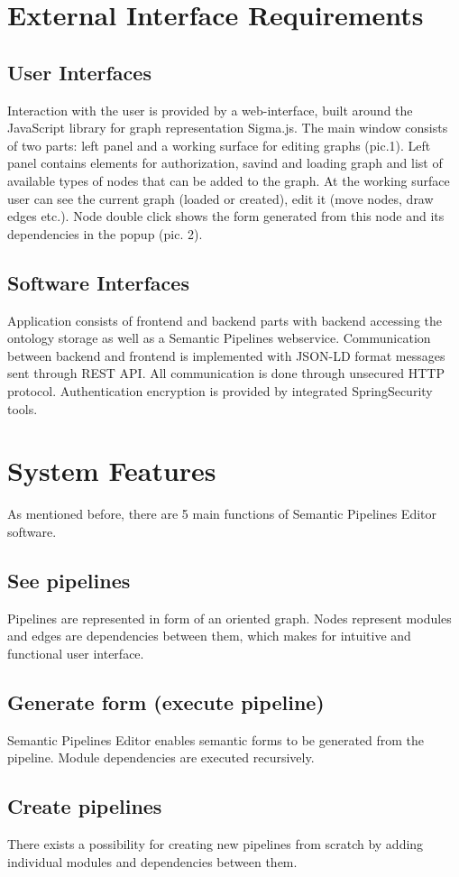 \documentclass{article}
\begin{document}
\section{External Interface Requirements}
\subsection{User Interfaces}
Interaction with the user is provided by a web-interface, built around the JavaScript library for graph representation Sigma.js. The main window consists of two parts: left panel and a working surface for editing graphs (pic.1). Left panel contains elements for authorization, savind and loading graph and list of available types of nodes that can be added to the graph. At the working surface user can see the current graph (loaded or created), edit it (move nodes, draw edges etc.). Node double click shows the form generated from this node and its dependencies in the popup (pic. 2).
\subsection{Software Interfaces}
Application consists of frontend and backend parts with backend accessing the ontology storage as well as a Semantic Pipelines webservice. Communication between backend and frontend is implemented with JSON-LD format messages sent through REST API. All communication is done through unsecured HTTP protocol. Authentication encryption is provided by integrated SpringSecurity tools. 
\section{System Features}
\label{sec:features}
As mentioned before, there are 5 main functions of Semantic Pipelines Editor software.
\subsection{See pipelines}
Pipelines are represented in form of an oriented graph. Nodes represent modules and edges are dependencies between them, which makes for intuitive and functional user interface.
\subsection{Generate form (execute pipeline)}
Semantic Pipelines Editor enables semantic forms to be generated from the pipeline. Module dependencies are executed recursively.
\subsection{Create pipelines}
There exists a possibility for creating new pipelines from scratch by adding individual modules and dependencies between them.
\end{document}
